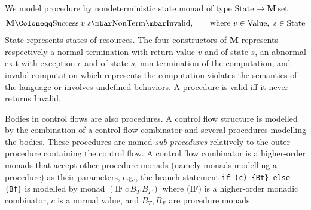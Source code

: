 We model procedure by nondeterministic state monad of type $\mathrm{State} \rightarrow \mathbf{M}~\mathrm{set}$.
\begin{gather*}
\mathbf{M} \Coloneqq \mathrm{Success}\;v\;s \mbar \mathrm{NonTerm} \mbar \mathrm{Invalid},\qquad
  \text{where $v \in \mathrm{Value},\ s \in \text{State}$}
\end{gather*}
State represents states of resources.
The four constructors of $\mathbf{M}$ represents respectively a normal termination with return value $v$ and of state $s$, an abnormal exit with exception $e$ and of state $s$, non-termination of the computation, and invalid computation which represents the computation violates the semantics of the language or involves undefined behaviors.
A procedure is valid iff it never returns Invalid.

Bodies in control flows are also procedures.
A control flow structure is modelled by the combination of a control flow combinator and several procedures modelling the bodies.
These procedures are named {\it sub-procedures} relatively to the outer procedure containing the control flow.
A control flow combinator is a higher-order monads that accept other procedure monads (namely monads modelling a procedure) as their parameters, e.g.,
the branch statement \texttt{if (c) \{Bt\} else \{Bf\}} is modelled by monad $(\mathrm{IF}\,c\,B_T\,B_F)$ where (IF) is a higher-order monadic combinator, $c$ is a normal value, and $B_T, B_F$ are procedure monads.

